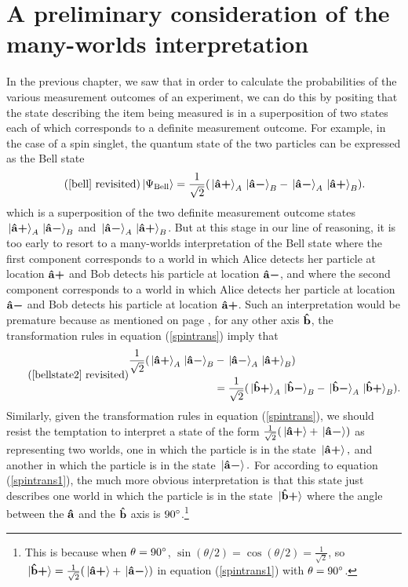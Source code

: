 \section{A preliminary consideration of the many-worlds interpretation}
     In the previous chapter, we saw that in order to calculate the probabilities of the various measurement outcomes of an experiment, we can do this by positing that the state describing the item being measured is in a superposition of two states each of which corresponds to a definite measurement outcome. For example, in the case of a spin singlet, the quantum state of the two particles can be expressed as the Bell state
     \begin{equation}\tag{\ref{bell} revisited}          
          \ket*{\Psi_{\text{Bell}}}=\frac{1}{\sqrt{2}}(\ket*{\uvbp{a}}_A\ket*{\uvbm{a}}_B-\ket*{\uvbm{a}}_A\ket*{\uvbp{a}}_B). 
      \end{equation}
     which is a superposition of the two definite measurement outcome states  $\ket*{{\vb{\hat{{a}}}\bm{+}}}_A\ket*{{\vb{\hat{{a}}}\bm{-}}}_B$ and $\ket*{{\vb{\hat{{a}}}\bm{-}}}_A\ket*{{\vb{\hat{{a}}}\bm{+}}}_B$.
    But at this stage in our line of reasoning, it is too early to resort to a many-worlds interpretation of the Bell state where  the first component corresponds to a world in which Alice detects her particle at location ${\vb{\hat{{a}}}\bm{+}}$ and Bob detects his particle at location ${\vb{\hat{{a}}}\bm{-}}$, and where the second component corresponds to a world in which Alice detects her particle at location ${\vb{\hat{{a}}}\bm{-}}$ and Bob detects his particle at location ${\vb{\hat{{a}}}\bm{+}}$. Such an interpretation would be premature because as mentioned on page \pageref{bellstate2}, for any other axis $\vb{\hat{{b}}}$, the transformation rules in equation (\ref{spintrans}) imply that 
    \begin{equation*}\tag{\ref{bellstate2} revisited}
     \begin{split}
     \frac{1}{\sqrt{2}}(\ket*{\uvbp{a}}_A\ket*{\uvbm{a}}_B&-\ket*{\uvbm{a}}_A\ket*{\uvbp{a}}_B)\\
     &=\frac{1}{\sqrt{2}}(\ket*{\uvbp{b}}_A\ket*{\uvbm{b}}_B-\ket*{\uvbm{b}}_A\ket*{\uvbp{b}}_B).
\end{split}
\end{equation*}
    Similarly, given the transformation rules in equation (\ref{spintrans}), we should resist the temptation  to interpret a state of the form $\frac{1}{\sqrt{2}}(\ket*{{\vb{\hat{{a}}}\bm{+}}}+\ket*{{\vb{\hat{{a}}}\bm{-}}})$ as representing two worlds, one in which the particle is in the state $\ket*{{\vb{\hat{{a}}}\bm{+}}},$ and another in which the particle is in the state $\ket*{{\vb{\hat{{a}}}\bm{-}}}.$ For according to equation (\ref{spintrans1}), the much more obvious interpretation is that this state just describes one world in which the particle is in the state $\ket*{{\vb{\hat{{b}}}\bm{+}}}$ where the angle between
     the $\vb{\hat{{a}}}$ and the  $\vb{\hat{{b}}}$ axis is $90\degree$.\footnote{This is because when $\theta=90\degree$, $\sin(\theta/2)=\cos(\theta/2)=\frac{1}{\sqrt{2}}$, so  $\ket*{{\vb{\hat{{b}}}\bm{+}}}= \frac{1}{\sqrt{2}}(\ket*{{\vb{\hat{{a}}}\bm{+}}}+\ket*{{\vb{\hat{{a}}}\bm{-}}})$ in equation (\ref{spintrans1}) with $\theta=90\degree$. } 
     
